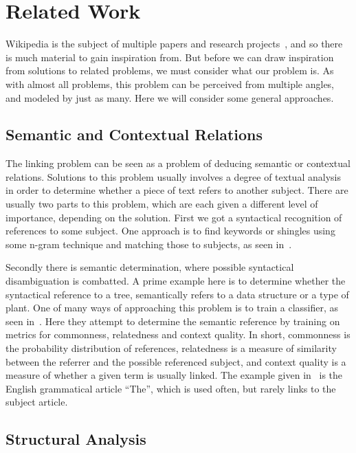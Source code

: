 \section{Related Work}\label{sec:related_work}

Wikipedia is the subject of multiple papers and research projects~\cite{wiki-research-newsletter}, and so there is much material to gain inspiration from. But before we can draw inspiration from solutions to related problems, we must consider what our problem is. As with almost all problems, this problem can be perceived from multiple angles, and modeled by just as many. Here we will consider some general approaches.

\subsection{Semantic and Contextual Relations}\label{related_semantic_contextual}

The linking problem can be seen as a problem of deducing semantic or contextual relations. Solutions to this problem usually involves a degree of textual analysis in order to determine whether a piece of text refers to another subject. There are usually two parts to this problem, which are each given a different level of importance, depending on the solution. First we got a syntactical recognition of references to some subject. One approach is to find keywords or shingles using some n-gram technique and matching those to subjects, as seen in~\cite{mihalcea2007wikify}. 

Secondly there is semantic determination, where possible syntactical disambiguation is combatted. A prime example here is to determine whether the syntactical reference to a tree, semantically refers to a data structure or a type of plant. One of many ways of approaching this problem is to train a classifier, as seen in~\cite{milne2008learning}. Here they attempt to determine the semantic reference by training on metrics for commonness, relatedness and context quality. In short, commonness is the probability distribution of references, relatedness is a measure of similarity between the referrer and the possible referenced subject, and context quality is a measure of whether a given term is usually linked. The example given in~\cite{milne2008learning} is the English grammatical article \enquote{The}, which is used often, but rarely links to the subject article.

\subsection{Structural Analysis}\label{related_structural_analysis}

